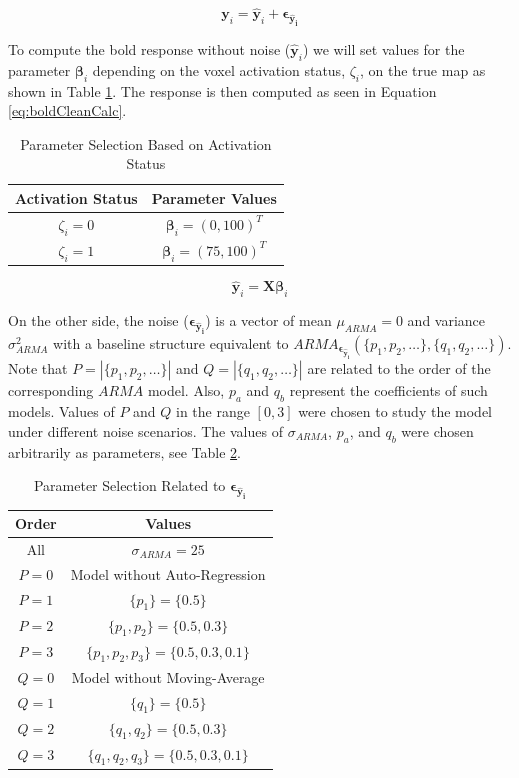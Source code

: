 \begin{equation}
\bm{y}_i = \bm{\hat{y}}_i + \bm{\epsilon}_{\bm{\hat{y}_i}}
\end{equation}

To compute the \gls{bold} response without noise ($\bm{\hat{y}}_i$) we will set values for the parameter $\bm{\beta}_i$ depending on the voxel activation status, $\zeta_i$, on the true map as shown in Table \ref{tab:betaParameter}. The response is then computed as seen in Equation \ref{eq:boldCleanCalc}.

\begin{table}[htbp!]
\centering
\caption{Parameter Selection Based on Activation Status}
\begin{tabular}{cc}
\hline
\textbf{Activation Status} & \textbf{Parameter Values} \\ \hline
$\zeta_i=0$ & $\bm{\beta}_i = (0,100)^T$ \\
$\zeta_i=1$ & $\bm{\beta}_i = (75,100)^T$ \\ \hline
\end{tabular}
\label{tab:betaParameter}
\end{table}

\begin{equation} \label{eq:boldCleanCalc}
\bm{\hat{y}}_i = \bm{X}\bm{\beta}_i
\end{equation}

On the other side, the noise ($\bm{\epsilon}_{\bm{\hat{y}_i}}$) is a vector of mean $\mu_{ARMA} = 0$ and variance $\sigma_{ARMA}^2$ with a baseline structure equivalent to $ARMA_{\bm{\epsilon}_{\bm{\hat{y}_i}}}\left( \{p_1,p_2,\dots\},\{q_1,q_2,\dots\} \right)$. Note that $P = \left| \{p_1,p_2,\dots\} \right|$ and $Q= \left| \{q_1,q_2,\dots\} \right|$ are related to the order of the corresponding $ARMA$ model. Also, $p_a$ and $q_b$ represent the coefficients of such models. Values of $P$ and $Q$ in the range $[0,3]$ were chosen to study the model under different noise scenarios. The values of $\sigma_{ARMA}$, $p_a$, and $q_b$ were chosen arbitrarily as parameters, see Table \ref{tab:noiseParameters}.

\begin{table}[htbp!]
\centering
\caption{Parameter Selection Related to $\bm{\epsilon}_{\bm{\hat{y}_i}}$}
\begin{tabular}{cc}
\hline
\textbf{Order} & \textbf{Values} \\ \hline
All & $\sigma_{ARMA}=25$ \\ 
$P=0$ & Model without Auto-Regression \\ 
$P=1$ & $\{p_1\} = \{0.5\}$ \\ 
$P=2$ & $\{p_1,p_2\} = \{0.5,0.3\}$ \\ 
$P=3$ & $\{p_1,p_2,p_3\} = \{0.5,0.3,0.1\}$ \\
$Q=0$ & Model without Moving-Average \\ 
$Q=1$ & $\{q_1\} = \{0.5\}$ \\ 
$Q=2$ & $\{q_1,q_2\} = \{0.5,0.3\}$ \\ 
$Q=3$ & $\{q_1,q_2,q_3\} = \{0.5,0.3,0.1\}$ \\\hline
\end{tabular}
\label{tab:noiseParameters}
\end{table}